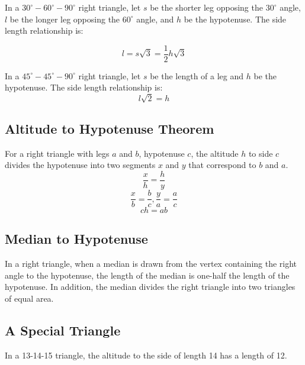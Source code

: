 \documentclass[final, letterpaper, 12pt]{article}
\begin{document}
		In a $30^{\circ}-60^{\circ}-90^{\circ}$ right triangle, let $s$ be the shorter leg opposing the $30^{\circ}$ angle, $l$ be the longer leg opposing the $60^{\circ}$ angle, and $h$ be the hypotenuse. The side length relationship is:

		\begin{equation}
			l = s\sqrt{3} = \frac{1}{2}h\sqrt{3}
		\end{equation}
		
		In a $45^{\circ}-45^{\circ}-90^{\circ}$ right triangle, let $s$ be the length of a leg and $h$ be the hypotenuse. The side length relationship is:
		\begin{equation}
			l\sqrt{2} = h
		\end{equation}
		
	
	\subsection{Altitude to Hypotenuse Theorem}\label{sec: altitude to hypotenuse theorem}
		For a right triangle with legs $a$ and $b$, hypotenuse $c$, the altitude $h$ to side $c$ divides the hypotenuse into two segments $x$ and $y$ that correspond to $b$ and $a$.
		\begin{equation}\label{eqn:similarity relations 1}
			\frac{x}{h} = \frac{h}{y}
		\end{equation}
		\begin{equation}\label{eqn:similarity relations 2}
			\frac{x}{b} = \frac{b}{c}, \frac{y}{a} = \frac{a}{c}
		\end{equation}
		\begin{equation}\label{eqn:similarity relations 3}
			ch = ab 
		\end{equation} 
	
	\subsection{Median to Hypotenuse}\label{sec: median to hypotenuse}
		In a right triangle, when a median is drawn from the vertex containing the right angle to the hypotenuse, the length of the median is one-half the length of the hypotenuse. In addition, the median divides the right triangle into two triangles of equal area.
	
	\subsection{A Special Triangle}\label{sec: special triangle situation}
		In a 13-14-15 triangle, the altitude to the side of length 14 has a length of 12.
	
\end{document}
